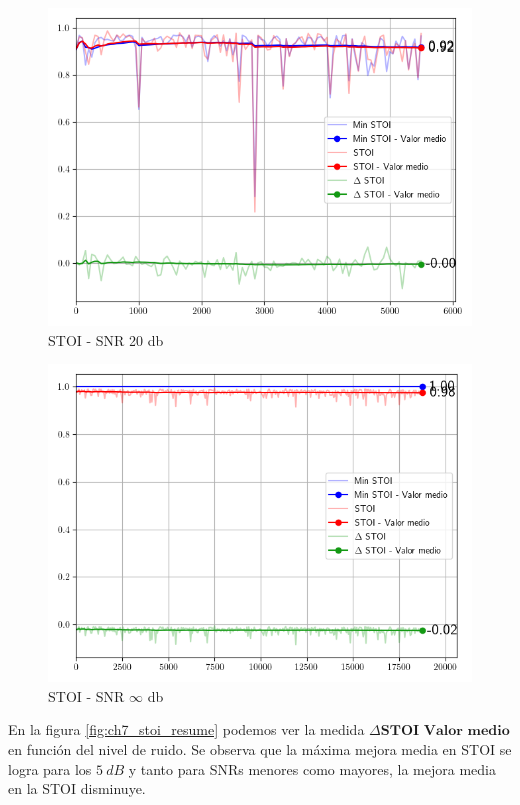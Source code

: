 \begin{figure}
	\centering
	\centerline{\includegraphics[scale=0.70]{images/ch7/objective_metrics/metric_STOI_20db.png}}
	\caption{STOI - SNR 20 db}
	\label{fig:ch7_stoi_tweenty_db}
\end{figure}

\begin{figure}[H]
	\centering
	\centerline{\includegraphics[scale=0.70]{images/ch7/objective_metrics/metric_STOI_infdb.png}}
	\caption{STOI - SNR $\infty$ db}
	\label{fig:ch7_stoi_inf_db}
\end{figure}


En la figura \ref{fig:ch7_stoi_resume} podemos ver la medida $\Delta \textbf{STOI Valor medio}$ en función del nivel de ruido. Se observa que la máxima mejora media en STOI se logra para los $\SI{5}{dB}$ y tanto para SNRs menores como mayores, la mejora media en la STOI disminuye.

